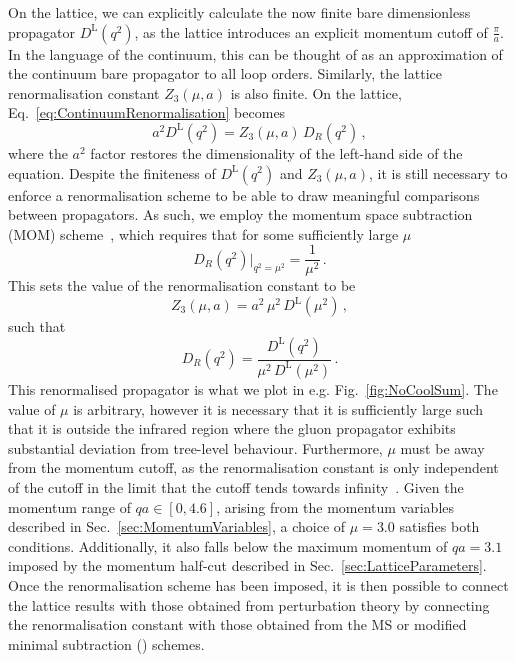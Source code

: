 On the lattice, we can explicitly calculate the now finite bare dimensionless propagator $D^\text{L}(q^2)$, as the lattice introduces an explicit momentum cutoff of $\frac{\pi}{a}$. In the language of the continuum, this can be thought of as an approximation of the continuum bare propagator to all loop orders. Similarly, the lattice renormalisation constant $Z_3(\mu, a)$ is also finite. On the lattice, Eq.~\ref{eq:ContinuumRenormalisation} becomes
%
\begin{equation}
a^2 D^\text{L}(q^2) = Z_3(\mu, a)\, D_R(q^2)\, ,
\label{eq:LatticeRenormalisation}
\end{equation}
%
where the $a^2$ factor restores the dimensionality of the left-hand side of the equation. Despite the finiteness of $D^\text{L}(q^2)$ and $Z_3(\mu, a)$, it is still necessary to enforce a renormalisation scheme to be able to draw meaningful comparisons between propagators. As such, we employ the momentum space subtraction (MOM) scheme~\cite{Bowman:2004jm,Leinweber:1998uu,Bonnet:2001uh}, which requires that for some sufficiently large $\mu$
%
\begin{equation}
D_R(q^2)\big|_{q^2=\mu^2}=\frac{1}{\mu^2}\, .
\end{equation}
%
This sets the value of the renormalisation constant to be
%
\begin{equation}
Z_3(\mu,a) = a^2 \, \mu^2 \, D^\text{L}(\mu^2)\, ,
\end{equation}
such that
%
\begin{equation}
D_R(q^2) = \frac{D^\text{L}(q^2)}{\mu^2 \, D^\text{L}(\mu^2)}\, .
\end{equation}
%
This renormalised propagator is what we plot in e.g. Fig.~\ref{fig:NoCoolSum}. The value of $\mu$ is arbitrary, however it is necessary that it is sufficiently large such that it is outside the infrared region where the gluon propagator exhibits substantial deviation from tree-level behaviour. Furthermore, $\mu$ must be away from the momentum cutoff, as the renormalisation constant is only independent of the cutoff in the limit that the cutoff tends towards infinity~\cite{Bonnet:2001uh,Boucaud:2006pc}. Given the momentum range of $qa\in [0,4.6]$, arising from the momentum variables described in Sec.~\ref{sec:MomentumVariables}, a choice of $\mu =3.0$ satisfies both conditions. Additionally, it also falls below the maximum momentum of $qa = 3.1$ imposed by the momentum half-cut described in Sec.~\ref{sec:LatticeParameters}. Once the renormalisation scheme has been imposed, it is then possible to connect the lattice results with those obtained from perturbation theory by connecting the renormalisation constant with those obtained from the MS or modified minimal subtraction () schemes.\\

